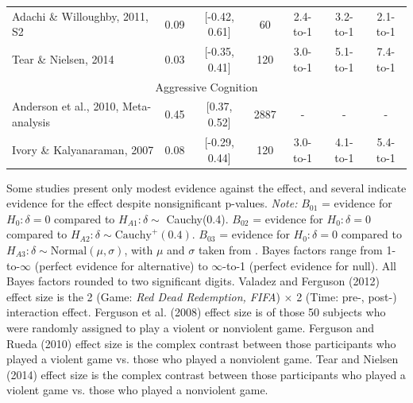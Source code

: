 \documentclass[man]{apa6}
\begin{document}
\begin{table}
\begin{tabular}{lcccccc}
\hspace{.2in} Adachi \& Willoughby, 2011, S2&0.09&[-0.42, 0.61]&60&2.4-to-1&3.2-to-1&2.1-to-1 \\
\hspace{.2in} Tear \& Nielsen, 2014 &0.03&[-0.35, 0.41]&120&3.0-to-1&5.1-to-1&7.4-to-1 \\
\multicolumn{7}{c}{Aggressive Cognition}\\
Anderson et al., 2010, Meta-analysis&0.45&[0.37, 0.52]&2887&-&-&- \\
\hspace{.2in} Ivory \& Kalyanaraman, 2007&0.08&[-0.29, 0.44]&120&3.0-to-1&4.1-to-1&5.4-to-1 \\ \hline
\end{tabular}

\vspace{4mm}
Some studies present only modest evidence against the effect, and several indicate evidence for the effect despite nonsignificant p-values. 
{\em Note:} $B_{01}$ = evidence for $H_0: \delta = 0$ compared to $H_{A1}: \delta \sim$ Cauchy(0.4). $B_{02}$ = evidence for $H_0: \delta = 0$ compared to $H_{A2}: \delta \sim \mbox{Cauchy}^{+}(0.4)$. $B_{03}$ = evidence for $H_0: \delta = 0$ compared to $H_{A3}: \delta \sim \mbox{Normal}(\mu, \sigma)$, with $\mu$ and $\sigma$ taken from \citet{Anderson:etal:2010}. Bayes factors range from 1-to-$\infty$ (perfect evidence for alternative) to $\infty$-to-1 (perfect evidence for null). All Bayes factors rounded to two significant digits. Valadez and Ferguson (2012) effect size is the 2 (Game: {\em Red Dead Redemption, FIFA}) $\times$ 2 (Time: pre-, post-) interaction effect. Ferguson et al. (2008) effect size is of those 50 subjects who were randomly assigned to play a violent or nonviolent game. Ferguson and Rueda (2010) effect size is the complex contrast between those participants who played a violent game vs. those who played a nonviolent game. Tear and Nielsen (2014) effect size is the complex contrast between those participants who played a violent game vs. those who played a nonviolent game.
\label{mainStudyResults}
\end{table}
\end{document}
